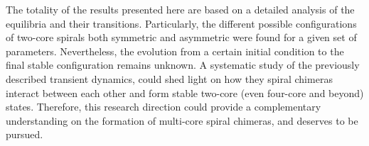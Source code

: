 The totality of the results presented here are based on a detailed analysis of the equilibria
and their transitions. Particularly, the different possible configurations of two-core spirals
both symmetric and asymmetric were found for a given set of parameters. Nevertheless,
the evolution from a certain initial condition to the final stable configuration remains
unknown. A systematic study of the previously described transient dynamics, could shed light on how they spiral
chimeras interact between each other and form stable two-core (even four-core and beyond)
states. Therefore, this research direction could provide a complementary understanding on
the formation of multi-core spiral chimeras, and deserves to be pursued.